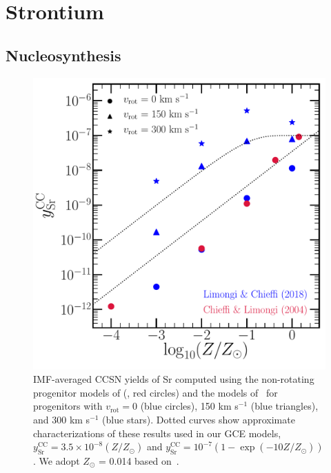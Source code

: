 
\section{Strontium}
\label{bursts:sec:sr}
\subsection{Nucleosynthesis}
\label{bursts:sec:sr_nuc}

\begin{figure} %
\includegraphics[scale = 0.45]{sr_cc_yields.pdf}
\caption{
IMF-averaged CCSN yields of Sr computed using the non-rotating progenitor 
models of (\citealp{Chieffi2004}, red circles) and the models 
of~\citet{Limongi2018} for progenitors with $v_\text{rot} = 0$ (blue circles), 
150 km s$^{-1}$ (blue triangles), and 300 km s$^{-1}$ (blue stars). Dotted 
curves show approximate characterizations of these results used in our GCE 
models, $y_\text{Sr}^\text{CC} = 3.5\times10^{-8}(Z/Z_\odot)$ and 
$y_\text{Sr}^\text{CC} = 10^{-7}(1 - \exp{(-10Z/Z_\odot)})$. We adopt $Z_\odot$ = 
0.014 based on~\citet{Asplund2009}. 
}
\label{bursts:fig:sr_cc_yields}
\end{figure} 

